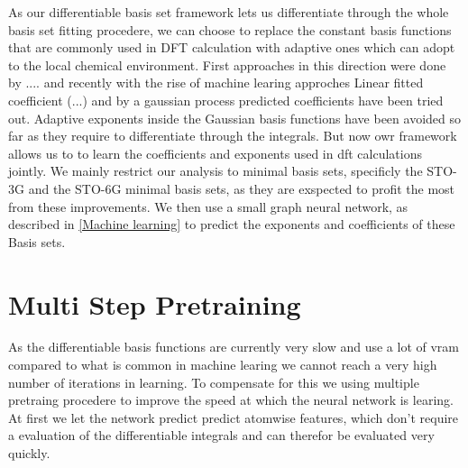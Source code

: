 As our differentiable basis set framework lets us differentiate through the whole basis set fitting procedere, we can choose to replace the constant basis functions that are commonly used in DFT calculation with adaptive ones which can adopt to the local chemical environment. First approaches in this direction were done by .... and recently with the rise of machine learing approches Linear fitted coefficient (...) and by a gaussian process predicted coefficients have been tried out. Adaptive exponents inside the Gaussian basis functions have been avoided so far as they require to differentiate through the integrals. But now owr framework allows us to to learn the coefficients and exponents used in dft calculations jointly. We mainly restrict our analysis to minimal basis sets, specificly the STO-3G and the STO-6G\cite{STO-3G} minimal basis sets, as they are exspected to profit the most from these improvements. We then use a small graph neural network, as described in \ref{Machine learning} to predict the exponents and coefficients of these Basis sets.
\section{Multi Step Pretraining}
As the differentiable basis functions are currently very slow and use a lot of vram compared to what is common in machine learing we cannot reach a very high number of iterations in learning. To compensate for this we using multiple pretraing procedere to improve the speed at which the neural network is learing. At first we let the network predict predict atomwise features, which don't require a evaluation of the differentiable integrals and can therefor be evaluated very quickly.
